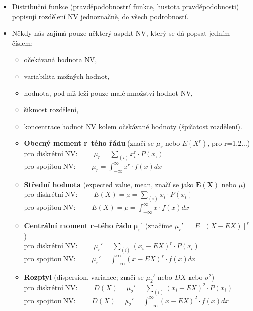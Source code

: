 \begin{itemize}
	\item Distribuční funkce (pravděpodobnostní funkce, hustota pravděpodobnosti) popisují rozdělení NV jednoznačně, do všech podrobností. 
	\item Někdy nás zajímá pouze některý aspekt NV, který se dá popsat jedním číslem:
	\begin{itemize}
		\item očekávaná hodnota NV,
		\item variabilita možných hodnot,
		\item hodnota, pod níž leží pouze malé množství hodnot NV,
		\item šikmost rozdělení,
		\item koncentrace hodnot NV kolem očekávané hodnoty (špičatost rozdělení).\\

		\item \textbf{Obecný moment r--tého řádu} (značí se $\mu_r$ nebo $E(X^r)$, pro r=1,2...) \\pro diskrétní NV: $\qquad \mu_r = \sum_{(i)}x_i^r \cdot P(x_i)$ \\pro spojitou NV: $\qquad \mu_r = \int_{-\infty}^{\infty} x^r \cdot f(x) dx$
		\item \textbf{Střední hodnota} (expected value, mean, značí se jako $\mathbf{E(X)}$ nebo $\mu$) \\pro diskrétní NV: $\qquad E(X) = \mu = \sum_{(i)}x_i \cdot P(x_i)$\\pro spojitou NV: $\qquad E(X) = \mu = \int_{-\infty}^{\infty} x \cdot f(x)dx$
		\item \textbf{Centrální moment r--tého řádu} $\mathbf{\mu_r}$' (značíme $\mu_r$' $= E[(X - EX)]^r$) \\pro diskrétní NV: $\qquad \mu_r' = \sum_{(i)}(x_i -EX)^r \cdot P(x_i)$\\pro spojitou NV: $\qquad \mu_r' = \int_{-\infty}^{\infty} (x - EX)^r \cdot f(x)dx$
		\item \textbf{Rozptyl} (dispersion, variance; značí se $\mu_2'$ nebo $DX$ nebo $\sigma^2$) \\pro diskrétní NV: $\qquad D(X) = \mu_2' = \sum_{(i)}(x_i -EX)^2 \cdot P(x_i)$\\pro spojitou NV: $\qquad D(X) = \mu_2' = \int_{-\infty}^{\infty} (x - EX)^2 \cdot f(x)dx$
	\end{itemize}
\end{itemize}

